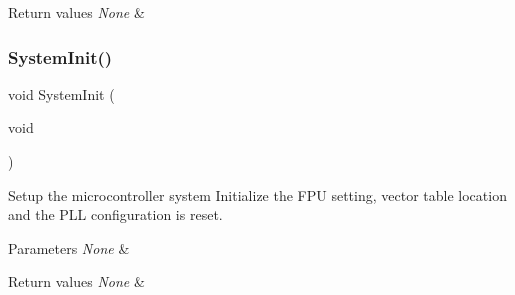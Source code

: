 \begin{DoxyRetVals}{Return values}
{\em None} & \\
\hline
\end{DoxyRetVals}
\mbox{\label{group__STM32F3xx__System__Private__Functions_gaf019145746f780cda3053023bd6c1819}} 
\subsubsection{\texorpdfstring{System\+Init()}{SystemInit()}}
{\footnotesize\ttfamily void System\+Init (\begin{DoxyParamCaption}\item[{void}]{ }\end{DoxyParamCaption})}



Setup the microcontroller system Initialize the F\+PU setting, vector table location and the P\+LL configuration is reset. 


\begin{DoxyParams}{Parameters}
{\em None} & \\
\hline
\end{DoxyParams}

\begin{DoxyRetVals}{Return values}
{\em None} & \\
\hline
\end{DoxyRetVals}
